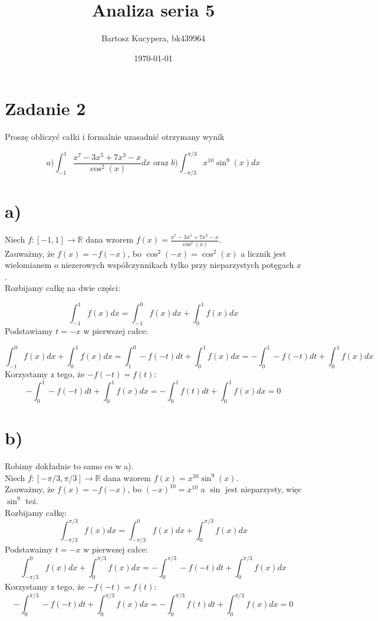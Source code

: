 \documentclass{article}
\title{Analiza seria 5}
\author{Bartosz Kucypera, bk439964}
\date{\today}
\begin{document}
\maketitle

\section*{Zadanie 2} 
Proszę obliczyć całki i formalnie uzasadnić otrzymany wynik

$$ a) \int_{-1}^1 \frac{x^7-3x^5 +7x^3-x}{\cos^2(x)}dx \mbox{ oraz } 
b) \int_{-\pi/3}^{\pi/3}x^{10}\sin ^9(x)dx $$

\section*{a)}
Niech $f:[-1,1] \to \mathbb{R}$ dana wzorem $f(x) = \frac{x^7-3x^5+7x^3-x}{\cos^2(x)}$. \\
Zauważmy, że $f(x) = -f(-x)$, bo $\cos^2(-x) = \cos^2(x)$ a licznik jest wielomianem o niezerowych współczynnikach tylko przy nieparzystych potęgach $x$. \\
Rozbijamy całkę na dwie części:

$$\int_{-1}^{1}f(x)dx = \int_{-1}^0f(x)dx + \int_0^1f(x)dx$$
Podstawiamy $t = -x$ w pierwszej całce:

$$\int_{-1}^0f(x)dx + \int_0^1f(x)dx = \int_1^0-f(-t)dt + \int_0^1f(x)dx = -\int_0^1-f(-t)dt + \int_0^1f(x)dx$$ 
Korzystamy z tego, że $-f(-t) = f(t)$:
$$-\int_0^1-f(-t)dt + \int_0^1f(x)dx = -\int_0^1f(t)dt + \int_0^1f(x)dx = 0$$

\section*{b)}
Robimy dokładnie to samo co w a). \\
Niech $f:[-\pi/3, \pi/3] \to \mathbb{R}$ dana wzorem $f(x) = x^{10}\sin^9(x)$. \\
Zauważmy, że $f(x) = -f(-x)$, bo $(-x)^{10} = x^{10}$ a $\sin$ jest nieparzysty, więc $\sin^9$ też. \\
Rozbijamy całkę:
$$ \int_{-\pi/3}^{\pi/3}f(x)dx = \int_{-\pi/3}^{0}f(x)dx + \int_{0}^{\pi/3}f(x)dx$$
Podstawaimy $t=-x$ w pierwszej całce:
$$\int_{-\pi/3}^{0}f(x)dx + \int_{0}^{\pi/3}f(x)dx = -\int_0^{\pi/3}-f(-t)dt + \int_0^{\pi/3}f(x)dx$$
Korzystamy z tego, że $-f(-t) = f(t)$:
$$-\int_0^{\pi/3}-f(-t)dt + \int_0^{\pi/3}f(x)dx = -\int_0^{\pi/3}f(t)dt + \int_0^{\pi/3}f(x)dx = 0$$
\end{document}
